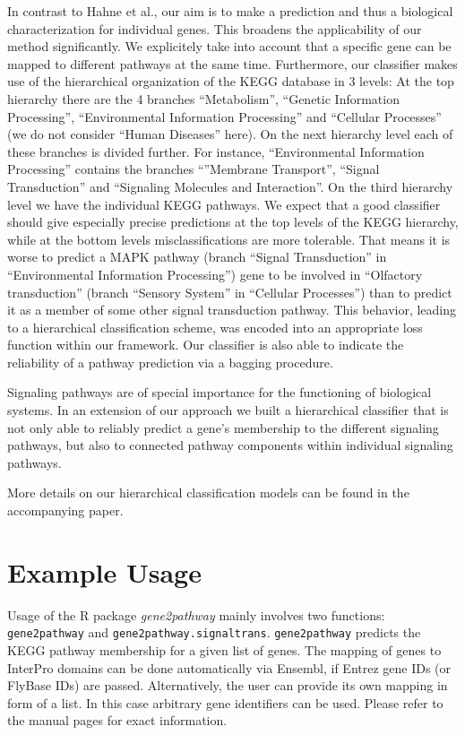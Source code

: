 \documentclass[11pt,a4paper]{article}
\begin{document}
In contrast to Hahne et al., our aim is to make a prediction and thus a biological characterization for individual genes. This broadens the applicability of our method significantly. We explicitely take into account that a specific gene can be mapped to different pathways at the same time. Furthermore, our classifier makes use of the hierarchical organization of the KEGG database in 3 levels: At the top hierarchy there are the 4 branches ``Metabolism'', ``Genetic Information Processing'', ``Environmental Information Processing'' and ``Cellular Processes'' (we do not consider ``Human Diseases'' here). On the next hierarchy level each of these branches is divided further. For instance, ``Environmental Information Processing'' contains the branches ``''Membrane Transport'', ``Signal Transduction'' and ``Signaling Molecules and Interaction''. On the third hierarchy level we have the individual KEGG pathways. We expect that a good classifier should give especially precise predictions at the top levels of the KEGG hierarchy, while at the bottom levels misclassifications are more tolerable. That means it is worse to predict a MAPK pathway (branch ``Signal Transduction'' in ``Environmental Information Processing'') gene to be involved in ``Olfactory transduction'' (branch ``Sensory System'' in ``Cellular Processes'') than to predict it as a member of some other signal transduction pathway. This behavior, leading to a hierarchical classification scheme, was encoded into an appropriate loss function within our framework. Our classifier is also able to indicate the reliability of a pathway prediction via a bagging procedure.

Signaling pathways are of special importance for the functioning of biological systems. In an extension of our approach we built a hierarchical classifier that is not only able to reliably predict a gene's membership to the different signaling pathways, but also to connected pathway components within individual signaling pathways.

More details on our hierarchical classification models can be found in the accompanying paper.
 

\section{Example Usage}

Usage of the R package \emph{gene2pathway} mainly involves two functions: {\tt gene2pathway} and {\tt gene2pathway.signaltrans}. {\tt gene2pathway} predicts the KEGG pathway membership for a given list of genes. The mapping of genes to InterPro domains can be done automatically via Ensembl, if Entrez gene IDs (or FlyBase IDs) are passed. Alternatively, the user can provide its own mapping in form of a list. In this case arbitrary gene identifiers can be used. Please refer to the manual pages for exact information.
\end{document}
